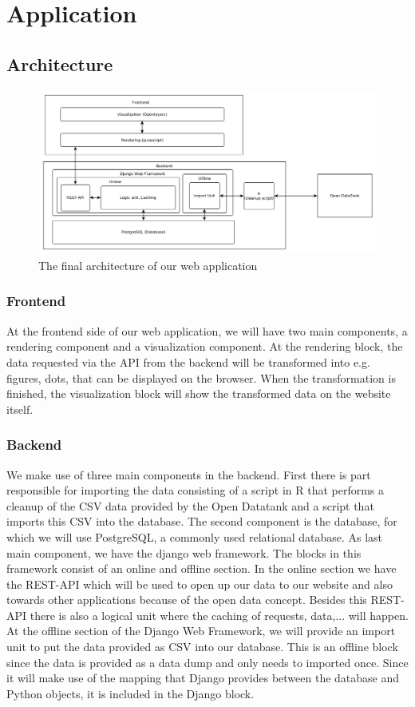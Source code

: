 \chapter{Application}
\section{Architecture}

\begin{figure}[h!]
  \centering
      \includegraphics[width=16cm]{fig/Architecture}
 	 \caption{The final architecture of our web application}
\end{figure}
\subsection{Frontend}
At the frontend side of our web application, we will have two main components, a rendering component and a visualization component. At the rendering block, the data requested via the API from the backend will be transformed into e.g. figures, dots, that can be displayed on the browser. When the transformation is finished, the visualization block will show the transformed data on the website itself.\\

\subsection{Backend}
We make use of three main components in the backend.
First there is part responsible for importing the data consisting of a script in R that performs a cleanup of the CSV data provided by the Open Datatank and a script that imports this CSV into the database. The second component is the database, for which we will use PostgreSQL, a commonly used relational database. As last main component, we have the django web framework. The blocks in this framework consist of an online and offline section. In the online section we have the REST-API which will be used to open up our data to our website and also towards other applications because of the open data concept. Besides this REST-API there is also a logical unit where the caching of requests, data,... will happen. At the offline section of the Django Web Framework, we will provide an import unit to put the data provided as CSV into our database. This is an offline block since the data is provided as a data dump and only needs to imported once. Since it will make use of the mapping that Django provides between the database and Python objects, it is included in the Django block.\\


